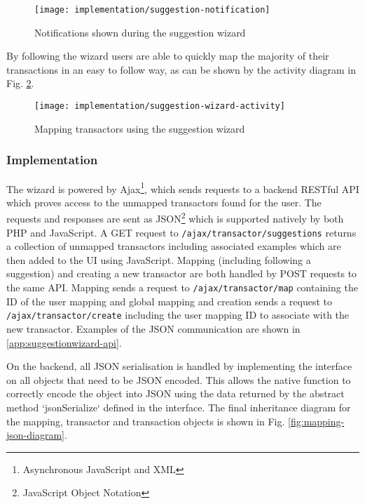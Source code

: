 \begin{figure}[h]
    \centering
    \texttt{[image: implementation/suggestion-notification]}
    \caption{Notifications shown during the suggestion wizard}
    \label{fig:suggestion-notification}
\end{figure}

By following the wizard users are able to quickly map the majority of their transactions in an easy to follow way, as can be shown by the activity diagram in Fig. \ref{fig:suggestion-wizard-activity}.

\begin{figure}[h]
    \centering
    \texttt{[image: implementation/suggestion-wizard-activity]}
    \caption{Mapping transactors using the suggestion wizard}
    \label{fig:suggestion-wizard-activity}
    
    \begin{comment}
(start)->(Map Transactor)-><a>->(end)
<a>->(Map Transactor)
    \end{comment}
\end{figure}

\subsubsection{Implementation} \label{subsub:wizard-implementation}
The wizard is powered by Ajax\footnote{Asynchronous JavaScript and XML}, which sends requests to a backend RESTful API which proves access to the unmapped transactors found for the user. The requests and responses are sent as JSON\footnote{JavaScript Object Notation} which is supported natively by both PHP and JavaScript. A GET request to \lstinline{/ajax/transactor/suggestions} returns a collection of unmapped transactors including associated examples which are then added to the UI using JavaScript.
%
Mapping (including following a suggestion) and creating a new transactor are both handled by POST requests to the same API. Mapping sends a request to \lstinline{/ajax/transactor/map} containing the ID of the user mapping and global mapping  and creation sends a request to \lstinline{/ajax/transactor/create} including the user mapping ID to associate with the new transactor. 
%
Examples of the JSON communication are shown in \autoref{app:suggestionwizard-api}.

On the backend, all JSON serialisation is handled by implementing the  interface on all objects that need to be JSON encoded. This allows the native function  to correctly encode the object into JSON using the data returned by the abstract method `jsonSerialize` defined in the interface. The final inheritance diagram for the mapping, transactor and transaction objects is shown in Fig. \ref{fig:mapping-json-diagram}.

